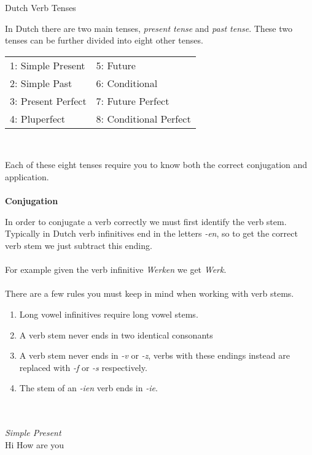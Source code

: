 \documentclass[letterpaper,11pt]{article}
\begin{document}
\begin{center}
    \LARGE{Dutch Verb Tenses}
\end{center}
\par{In Dutch there are two main tenses, \textit{present tense} and \textit{past
        tense}. These two tenses can be further divided into eight other tenses.}
\\
\begin{tabular}[t]{l l}
    1: Simple Present  & 5: Future              \\
    2: Simple Past     & 6: Conditional         \\
    3: Present Perfect & 7: Future Perfect      \\
    4: Pluperfect      & 8: Conditional Perfect \\
\end{tabular}
\\
\par{Each of these eight tenses require you to know both the correct conjugation
    and application.}
\\ \\
\textbf{Conjugation}
\\
\par{In order to conjugate a verb correctly we must first identify the verb stem.
    Typically in Dutch verb infinitives end in the letters \textit{-en}, so to
    get the correct verb stem we just subtract this ending.}
\\ \\
For example given the verb infinitive \textit{Werken} we get \textit{Werk}.
\\ \\ 
There are a few rules you must keep in mind when working with verb stems.
\\ 
\begin{enumerate}
    \item Long vowel infinitives require long vowel stems.
    \item A verb stem never ends in two identical consonants
    \item A verb stem never ends in \textit{-v} or \textit{-z}, verbs with these
        endings instead are replaced with \textit{-f} or \textit{-s} respectively.
    \item The stem of an \textit{-ien} verb ends in \textit{-ie}.
\end{enumerate}
\\ \\
\textit{Simple Present}
\\
Hi
How are you
\end{document}
